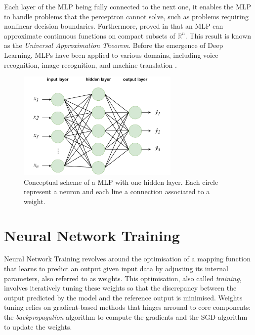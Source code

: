 Each layer of the \ac{MLP} being fully connected to the next one, it enables the
\ac{MLP} to handle problems that the perceptron cannot solve, such as problems
requiring nonlinear decision boundaries. Furthermore,
\citeauthor{cybenko1989approximation} proved in \cite{cybenko1989approximation}
that an \ac{MLP} can approximate continuous functions on compact subsets of
$\mathbb{R}^n$. This result is known as the \emph{Universal Approximation
Theorem}. Before the emergence of Deep Learning, \acp{MLP} have been applied to
various domains, including voice recognition, image recognition, and machine
translation \cite{wasserman1988neural}.


\begin{figure}[htbp]
  \centering
  \includegraphics[width=0.7\textwidth]{chapter_dlo/assets/mlp_scheme.pdf}
  \caption{Conceptual scheme of a \ac{MLP} with one hidden layer. Each circle
  represent a neuron and each line a connection associated to a weight.}
  \label{fig:dlo:mlp}
\end{figure}

\section{Neural Network Training}\label{sec:dlo:training}

Neural Network Training revolves around the optimisation of a mapping function
that learns to predict an output given input data by adjusting its internal
parameters, also referred to as weights. This optimisation, also called
\emph{training}, involves iteratively tuning these weights so that the
discrepancy between the output predicted by the model and the reference output
is minimised. Weights tuning relies on gradient-based methods that hinges
arround to core components: the \emph{backpropagation} algorithm to compute the
gradients and the \ac{SGD} algorithm to update the weights.

